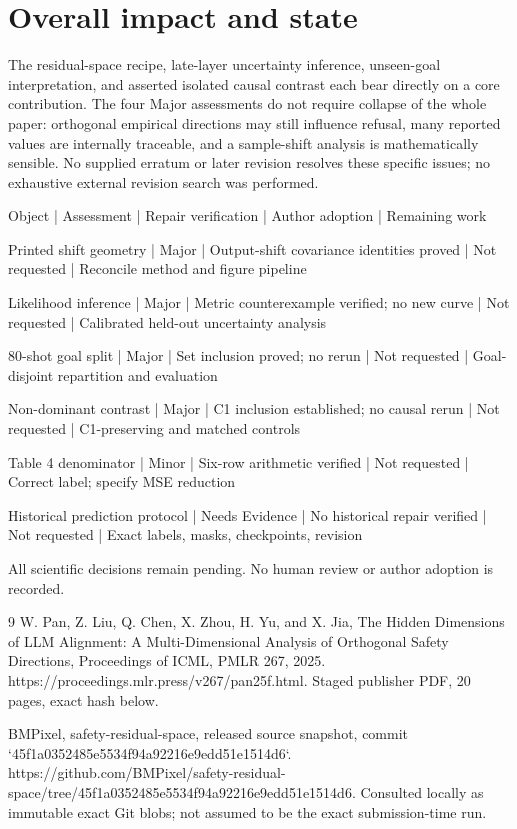 \documentclass[10pt]{article}
\begin{document}
\section*{Overall impact and state}
The residual-space recipe, late-layer uncertainty inference, unseen-goal interpretation, and asserted isolated causal contrast each bear directly on a core contribution. The four Major assessments do not require collapse of the whole paper: orthogonal empirical directions may still influence refusal, many reported values are internally traceable, and a sample-shift analysis is mathematically sensible. No supplied erratum or later revision resolves these specific issues; no exhaustive external revision search was performed.\par
Object | Assessment | Repair verification | Author adoption | Remaining work\par
Printed shift geometry | Major | Output-shift covariance identities proved | Not requested | Reconcile method and figure pipeline\par
Likelihood inference | Major | Metric counterexample verified; no new curve | Not requested | Calibrated held-out uncertainty analysis\par
80-shot goal split | Major | Set inclusion proved; no rerun | Not requested | Goal-disjoint repartition and evaluation\par
Non-dominant contrast | Major | C1 inclusion established; no causal rerun | Not requested | C1-preserving and matched controls\par
Table 4 denominator | Minor | Six-row arithmetic verified | Not requested | Correct label; specify MSE reduction\par
Historical prediction protocol | Needs Evidence | No historical repair verified | Not requested | Exact labels, masks, checkpoints, revision\par
All scientific decisions remain pending. No human review or author adoption is recorded.\par
9 W. Pan, Z. Liu, Q. Chen, X. Zhou, H. Yu, and X. Jia, The Hidden Dimensions of LLM Alignment: A Multi-Dimensional Analysis of Orthogonal Safety Directions, Proceedings of ICML, PMLR 267, 2025. https://proceedings.mlr.press/v267/pan25f.html. Staged publisher PDF, 20 pages, exact hash below.\par
BMPixel, safety-residual-space, released source snapshot, commit `45f1a0352485e5534f94a92216e9edd51e1514d6`. https://github.com/BMPixel/safety-residual-space/tree/45f1a0352485e5534f94a92216e9edd51e1514d6. Consulted locally as immutable exact Git blobs; not assumed to be the exact submission-time run.\par
\end{document}
